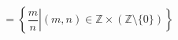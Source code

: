 \documentclass[preview]{standalone}
\begin{document}
\begin{align*}
= \left\{\left.{\dfrac {m}{n}}\right|(m,n)\in \mathbb{Z } \times (\mathbb{Z } \setminus \{0\})\right\}
\end{align*}
\end{document}
